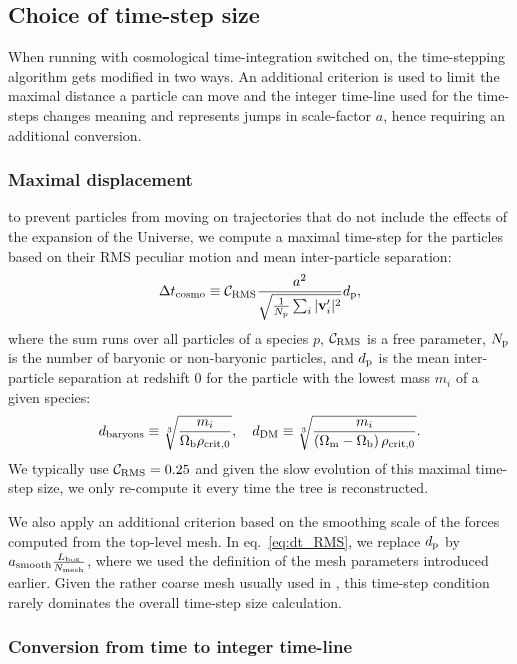 \subsection{Choice of time-step size}
\label{ssec:timesteps}

When running \swift with cosmological time-integration switched on, the
time-stepping algorithm gets modified in two ways. An additional criterion is
used to limit the maximal distance a particle can move and the integer time-line
used for the time-steps changes meaning and represents jumps in scale-factor $a$, 
hence requiring an additional conversion.

\subsubsection{Maximal displacement}

to prevent particles from moving on trajectories that do not include
the effects of the expansion of the Universe, we compute a maximal
time-step for the particles based on their RMS peculiar motion and
mean inter-particle separation:
\begin{equation}
  \Delta t_{\rm cosmo} \equiv \mathcal{C}_{\rm RMS} \frac{a^2}{\sqrt{\frac{1}{N_{\rm p}}\sum_i | \mathbf{v}_i' |^2}} d_{\rm p},
  \label{eq:dt_RMS}
\end{equation}
where the sum runs over all particles of a species $p$,
$\mathcal{C}_{\rm RMS}$ is a free parameter, $N_{\rm p}$ is the number
of baryonic or non-baryonic particles, and $d_{\rm p}$ is the mean
inter-particle separation at redshift $0$ for the particle with the
lowest mass $m_i$ of a given species:
\begin{equation}
  d_{\rm baryons} \equiv \sqrt[3]{\frac{m_i}{\Omega_{\rm b} \rho_{\rm crit, 0}}}, \quad d_{\rm DM} \equiv \sqrt[3]{\frac{m_i}{\left(\Omega_{\rm m} - \Omega_{\rm b}\right) \rho_{\rm crit, 0}}}.
  \nonumber
\end{equation}
We typically use $\mathcal{C}_{\rm RMS} = 0.25$ and given the slow
evolution of this maximal time-step size, we only re-compute it every
time the tree is reconstructed.

We also apply an additional criterion based on the smoothing scale of
the forces computed from the top-level mesh.  In eq.~\ref{eq:dt_RMS},
we replace $d_{\rm p}$ by
$a_{\rm smooth} \frac{L_{\rm box}}{N_{\rm mesh}}$, where we used the
definition of the mesh parameters introduced earlier. Given the rather
coarse mesh usually used in \swift, this time-step condition rarely
dominates the overall time-step size calculation.

\subsubsection{Conversion from time to integer time-line} 

